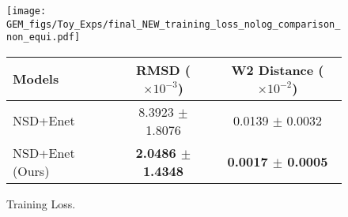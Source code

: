 \begin{figure}[h]
    \centering
    \begin{minipage}{0.32\textwidth}  %
        \texttt{[image: GEM\_figs/Toy\_Exps/final\_NEW\_training\_loss\_nolog\_comparison\_non\_equi.pdf]}
        \caption{Training Loss.}
        \label{fig:training_loss_nolog}
    \end{minipage}
    \hfill
    \begin{minipage}{0.65\textwidth}  %
    
        \centering
        \small
        \begin{tabular}{lcc}\toprule
Models & RMSD ($\times 10^{-3}$) & W2 Distance ($\times 10^{-2}$) \\\midrule
NSD+Enet &8.3923 $\pm$ 1.8076 &0.0139 $\pm$ 0.0032 \\
\rowcolor[HTML]{EAEAEA}NSD+Enet (Ours) &\textbf{2.0486 $\pm$ 1.4348} &\textbf{0.0017 $\pm$ 0.0005} \\
\bottomrule
\end{tabular}
        \label{tab:1d_toy}
    \end{minipage}
\end{figure}